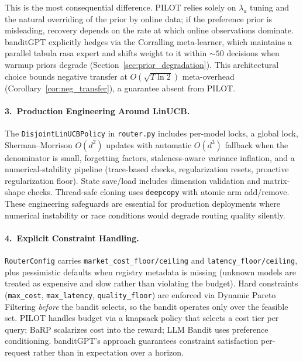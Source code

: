 \begin{itemize}[nosep]
    This is the most consequential difference.
    PILOT relies solely on $\lambda_a$ tuning and the natural overriding of
    the prior by online data; if the preference prior is misleading,
    recovery depends on the rate at which online observations dominate.
    banditGPT explicitly hedges via the Corralling meta-learner, which
    maintains a parallel tabula rasa expert and shifts weight to it within
    ${\sim}50$ decisions when warmup priors degrade
    (Section~\ref{sec:prior_degradation}).
    This architectural choice bounds negative transfer at
    $O(\sqrt{T \ln 2})$ meta-overhead
    (Corollary~\ref{cor:neg_transfer}), a guarantee absent from PILOT.
\end{itemize}

\paragraph{3.\ Production Engineering Around LinUCB.}
The \texttt{DisjointLinUCBPolicy} in \texttt{router.py} includes per-model
locks, a global lock, Sherman--Morrison $O(d^2)$ updates with automatic
$O(d^3)$ fallback when the denominator is small, forgetting factors,
staleness-aware variance inflation, and a numerical-stability pipeline
(trace-based checks, regularization resets, proactive regularization floor).
State save/load includes dimension validation and matrix-shape checks.
Thread-safe cloning uses \texttt{deepcopy} with atomic arm add/remove.
These engineering safeguards are essential for production deployments where
numerical instability or race conditions would degrade routing quality
silently.

\paragraph{4.\ Explicit Constraint Handling.}
\texttt{RouterConfig} carries \texttt{market\_cost\_floor/ceiling} and
\texttt{latency\_floor/ceiling}, plus pessimistic defaults when registry
metadata is missing (unknown models are treated as expensive and slow rather
than violating the budget).
Hard constraints (\texttt{max\_cost}, \texttt{max\_latency},
\texttt{quality\_floor}) are enforced via Dynamic Pareto Filtering
\emph{before} the bandit selects, so the bandit operates only over the
feasible set.
PILOT handles budget via a knapsack policy that selects a cost tier per
query; BaRP scalarizes cost into the reward; LLM Bandit uses preference
conditioning.
banditGPT's approach guarantees constraint satisfaction per-request rather
than in expectation over a horizon.

